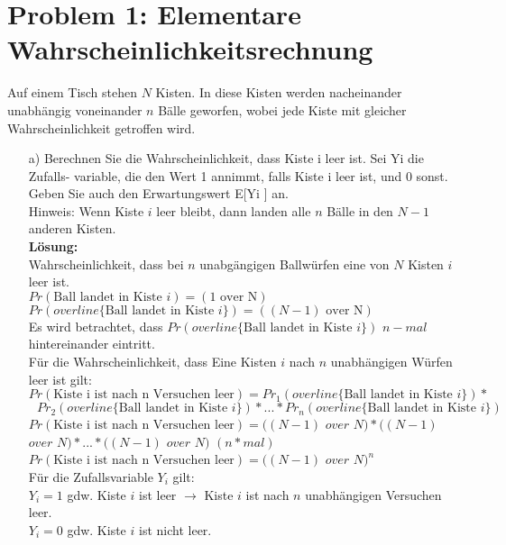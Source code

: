 \section*{{Problem 1: Elementare Wahrscheinlichkeitsrechnung}}

Auf einem Tisch stehen $N$ Kisten. In diese Kisten werden nacheinander unabhängig voneinander $n$ Bälle geworfen, wobei jede Kiste mit gleicher Wahrscheinlichkeit getroffen wird.\\

\begin{enumerate}
\item[a)] Berechnen Sie die Wahrscheinlichkeit, dass Kiste i leer ist. Sei Yi die Zufalls-
variable, die den Wert 1 annimmt, falls Kiste i leer ist, und 0 sonst. Geben Sie
auch den Erwartungswert E[Yi ] an.\\
Hinweis: Wenn Kiste $i$ leer bleibt, dann landen alle $n$ Bälle in den $N - 1$ anderen Kisten.\\

\textbf{Lösung:}\\

Wahrscheinlichkeit, dass bei $n$ unabgängigen Ballwürfen eine von $N$ Kisten $i$ leer ist.\\
$Pr(\text{Ball landet in Kiste } i ) = (1 \text{ over N})$\\
$Pr(overline\{ \text{Ball landet in Kiste }i\}) = ((N-1) \text{ over N})$\\
Es wird betrachtet, dass $Pr(overline\{ \text{Ball landet in Kiste }i\})$ $n-mal$ hintereinander eintritt.\\
Für die Wahrscheinlichkeit, dass Eine Kisten $i$ nach $n$ unabhängigen Würfen leer ist gilt:\\
$Pr(\text{Kiste i ist nach n Versuchen leer}) = Pr_1(overline\{ \text{Ball landet in Kiste }i\}) *$ \\ $\text{        }Pr_2(overline\{ \text{Ball landet in Kiste }i\}) *...* Pr_n(overline\{ \text{Ball landet in Kiste }i\})$\\
$Pr(\text{Kiste i ist nach n Versuchen leer}) = ((N-1)$ $over$ $N) * ((N-1)$ $over$ $N) *...* ((N-1)$ $over$ $N)$  $(n*mal)$\\
$Pr(\text{Kiste i ist nach n Versuchen leer}) = ((N-1)$ $over$ $N)^n$\\

\noindent
Für die Zufallsvariable $Y_i$ gilt:\\
$Y_i = 1$ gdw. Kiste $i$ ist leer $\rightarrow$ Kiste $i$ ist nach $n$ unabhängigen Versuchen leer.\\
$Y_i = 0$ gdw. Kiste $i$ ist nicht leer.\\


\end{enumerate}
